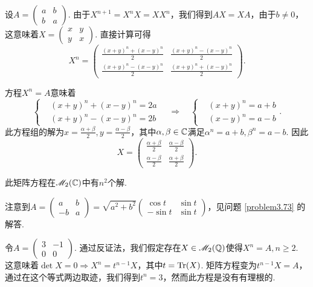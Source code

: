 \begin{solution}
  设$A=\begin{pmatrix}
    a & b \\
    b & a
  \end{pmatrix}$. 由于$X^{n+1}=X^nX=XX^n$，我们得到$AX=XA$，由于$b\ne0$，这意味着$X=\begin{pmatrix}
    x & y \\
    y & x
  \end{pmatrix}$. 直接计算可得
  \[
    X^n = \begin{pmatrix}
      \frac{(x+y)^n+(x-y)^n}2 & \frac{(x+y)^n-(x-y)^n}2 \\
      \frac{(x+y)^n-(x-y)^n}2 &
      \frac{(x+y)^n+(x-y)^n}2
    \end{pmatrix}.
  \]

  方程$X^n=A$意味着
  \[
    \left\{
      \begin{aligned}
        & (x+y)^n + (x-y)^n = 2a \\
        & (x+y)^n - (x-y)^n = 2b
      \end{aligned}
    \right.\quad \Rightarrow \quad
    \left\{
      \begin{aligned}
        & (x+y)^n = a + b \\
        & (x-y)^n = a - b
      \end{aligned}
    \right..
  \]
  此方程组的解为$x=\frac{\alpha+\beta}2,y=\frac{\alpha-\beta}2$，其中$\alpha,\beta\in\mathbb C$满足$\alpha^n=a+b,\beta^n=a-b$. 因此
  \[
    X = \begin{pmatrix}
      \frac{\alpha+\beta}2 & \frac{\alpha-\beta}2 \\
      \frac{\alpha-\beta}2 & \frac{\alpha+\beta}2
    \end{pmatrix}.
  \]

  此矩阵方程在$\mathscr M_2(\mathbb C)$中有$n^2$个解.
\end{solution}

\begin{solution}
  注意到$A=\begin{pmatrix}
    a & b \\
    -b & a
  \end{pmatrix}=\sqrt{a^2+b^2}\begin{pmatrix}
    \cos t & \sin t \\
    -\sin t & \sin t
  \end{pmatrix}$，见问题 \ref{problem3.73} 的解答.
\end{solution}

\begin{solution}
  令$A=\begin{pmatrix}
    3 & -1 \\
    0 & 0
  \end{pmatrix}$. 通过反证法，我们假定存在$X\in\mathscr M_2(\mathbb Q)$使得$X^n=A,n\ge2$. 这意味着$\det X=0\Rightarrow X^n=t^{n-1}X$，其中$t=\operatorname{Tr}(X)$. 矩阵方程变为$t^{n-1}X=A$，通过在这个等式两边取迹，我们得到$t^n=3$，然而此方程是没有有理根的.
\end{solution}

